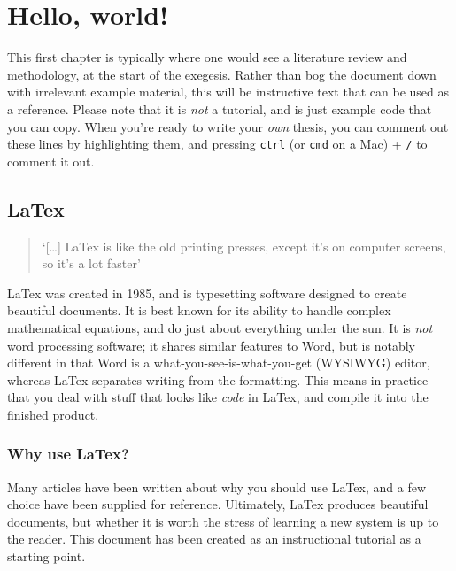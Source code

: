 
\renewcommand*{\thefootnote}{\arabic{footnote}}
\setcounter{footnote}{0}

\chapter{Hello, world!}

This first chapter is typically where one would see a literature review and methodology, at the start of the exegesis.
Rather than bog the document down with irrelevant example material, this will be instructive text that can be used as a reference.
Please note that it is \emph{not} a tutorial, and is just example code that you can copy.
When you're ready to write your \emph{own} thesis, you can comment out these lines by highlighting them, and pressing \lstinline{ctrl} (or \lstinline{cmd} on a Mac) + \lstinline{/} to comment it out.

\section{LaTex}

\begin{quotation}
    `[\ldots] LaTex is like the old printing presses, except it's on computer screens, so it's a lot faster'
\end{quotation}
LaTex was created in 1985, and is typesetting software designed to create beautiful documents. 
It is best known for its ability to handle complex mathematical equations, and do just about everything under the sun.
It is \emph{not} word processing software; it shares similar features to Word, but is notably different in that Word is a what-you-see-is-what-you-get (WYSIWYG) editor, whereas LaTex separates writing from the formatting.
This means in practice that you deal with stuff that looks like \emph{code} in LaTex, and compile it into the finished product. 

\subsection{Why use LaTex?}
Many articles have been written about why you should use LaTex, and a few choice have been supplied for reference.
Ultimately, LaTex produces beautiful documents, but whether it is worth the stress of learning a new system is up to the reader.
This document has been created as an instructional tutorial as a starting point.

